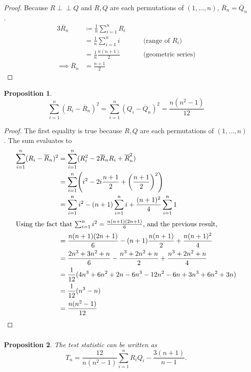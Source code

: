\documentclass[letterpaper, reqno]{amsart}
\newtheorem{prop}{Proposition}[section]
\numberwithin{equation}{section}
\newcommand{\indep}{\perp \!\!\! \perp}  %
\newcommand{\sumi}[2]{\sum_{#1=1}^{#2}}
\newcommand{\avg}[2]{\frac{1}{#2}\sumi{#1}{#2}}
\newcommand{\by}[1]{&\quad&\text{(#1)}}
\newcommand{\Rnbar}{\overline{R}_n}
\newcommand{\Qnbar}{\overline{Q}_n}
\begin{document}
\begin{proof}
  Because $R \indep Q$ and $R, Q$ are each permutations of $(1, \dots, n)$,
  $\Rnbar = \Qnbar$.
  \begin{alignat*}{3}
    \Rnbar &\coloneqq \avg{i}{n} R_i \\
           &= \avg{i}{n} i \by{range of $R_i$} \\
           &= \frac{1}{n} \frac{n(n+1)}{2} \by{geometric series} \\
   \implies \Rnbar &= \frac{n+1}{2} \tag*{\qedhere}
  \end{alignat*}
\end{proof}

\begin{prop} \label{prop:rn2}
  \[  \sumi{i}{n} (R_i - \Rnbar)^2 = \sumi{i}{n} (Q_i - \Qnbar)^2 = \frac{n(n^2 - 1)}{12} \]
\end{prop}

\begin{proof}
  The first equality is true because $R, Q$ are each permutations of $(1, \dots, n)$.
  The sum evaluates to
  \begin{alignat*}{3}
    \sumi{i}{n} (R_i - \Rnbar)^2 &= \sumi{i}{n} (R_i^2 - 2\Rnbar R_i + \Rnbar^2) \\
    &= \sumi{i}{n} \mleft(i^2 - 2 i \frac{n+1}{2} + \mleft(\frac{n+1}{2}\mright)^2 \mright) \\
    &= \sumi{i}{n} i^2 - (n+1)\sumi{i}{n} i + \frac{(n+1)^2}{4} \sumi{i}{n} 1 \\
    \intertext{Using the fact that $\sumi{i}{n} i^2 = \frac{n(n+1)(2n+1)}{6}$,
      and the previous result,}
    &= \frac{n(n+1)(2n+1)}{6} - (n+1) \frac{n(n+1)}{2} + \frac{n(n+1)^2}{4} \\
    &= \frac{2n^3 + 3n^2 + n}{6} - \frac{n^3 + 2n^2 + n}{2} + \frac{n^3 + 2n^2 + n}{4}  \\
    &= \frac{1}{12} (4n^3 + 6n^2 + 2n - 6n^3 - 12n^2 - 6n + 3n^3 + 6n^2 + 3n) \\
    &= \frac{1}{12} (n^3 - n) \\
    &= \frac{n(n^2 - 1)}{12} \tag*{\qedhere}
  \end{alignat*}
\end{proof}

\subsubsection{}
\begin{prop}
  The test statistic can be written as
  \[ T_n = \frac{12}{n(n^2 - 1)} \sumi{i}{n}R_iQ_i - \frac{3(n+1)}{n-1}. \]
\end{prop}
\end{document}
